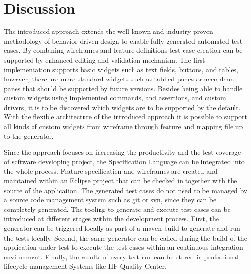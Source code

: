 \documentclass{sig-alternate-05-2015}
\begin{document}
{\section{Discussion}\label{sec:Discussion}
The introduced approach extends the well-known and industry proven methodology of behavior-driven design to enable fully generated automated test cases.
By combining wireframes and feature definitions test case creation can be supported by enhanced editing and validation mechanism.
The first implementation supports basic widgets such as text fields, buttons, and tables, however, there are more standard widgets such as tabbed panes or accordeon panes that should be supported by future versions.
Besides being able to handle custom widgets using implemented commands, and assertions, and custom drivers, it is to be discovered which widgets are to be supported by the default.
With the flexible architecture of the introduced approach it is possible to support all kinds of custom widgets from wireframe through feature and mapping file up to the generator.

Since the approach focuses on increasing the productivity and the test coverage of software developing project, the Specification Language can be integrated into the whole process.
Feature specification and wireframes are created and maintained within an Eclipse project that can be checked in together with the source of the application.
The generated test cases do not need to be managed by a source code management system such as git or svn, since they can be completely generated.
The tooling to generate and execute test cases can be introduced at different stages within the development process. 
First, the generator can be triggered locally as part of a maven build to generate and run the tests locally.
Second, the same generator can be called during the build of the application under test to execute the test cases within an continuous integration environment.
Finally, the results of every test run can be stored in professional lifecycle management Systems like HP Quality Center.

}
\end{document}
